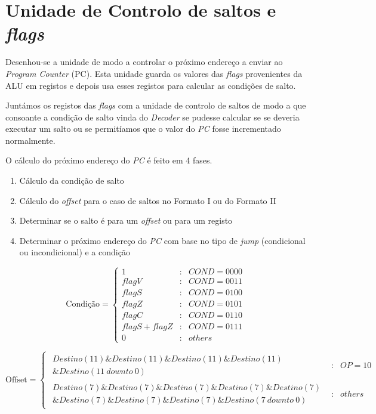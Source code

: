 \section{Unidade de Controlo de saltos e \textit{flags}}
Desenhou-se a unidade de modo a controlar o próximo endereço a enviar ao \textit{Program Counter} (PC). Esta unidade guarda os valores das \textit{flags} provenientes da ALU em registos e depois usa esses registos para calcular as condições de salto.\par
Juntámos os registos das \textit{flags} com a unidade de controlo de saltos de modo a que consoante a condição de salto vinda do \textit{Decoder} se pudesse calcular se se deveria executar um salto ou se permitíamos que o valor do \textit{PC} fosse incrementado normalmente.\par
O cálculo do próximo endereço do \textit{PC} é feito em 4 fases.
\begin{enumerate}
	\setlength{\itemindent}{25pt}
	\item Cálculo da condição de salto
	\item Cálculo do \textit{offset} para o caso de saltos no Formato I ou do Formato II
	\item Determinar se o salto é para um \textit{offset} ou para um registo
	\item Determinar o próximo endereço do \textit{PC} com base no tipo de \textit{jump} (condicional ou incondicional) e a condição
\end{enumerate}

\[\text{Condição}=\left\{
\begin{array}{rcl}
1 & : & COND=0000\\
flagV & : & COND=0011\\
flagS & : & COND=0100\\
flagZ & : & COND=0101\\
flagC & : &  COND=0110\\
flagS+flagZ & : & COND=0111\\
0 & : & others
\end{array}\right.\]

\[\text{Offset}=\left\{
\begin{array}{rcl}
\begin{array}{r}
Destino(11) \&Destino(11) \&Destino(11) \&Destino(11)\\
\&Destino(11\ downto\ 0)
\end{array} & : & OP=10\\
\begin{array}{r}
Destino(7)\&Destino(7)\&Destino(7)\&Destino(7)\&Destino(7)\\
\&Destino(7)\&Destino(7)\&Destino(7)\&Destino(7\ downto\ 0)
\end{array} & : & others
\end{array}\right.\]

